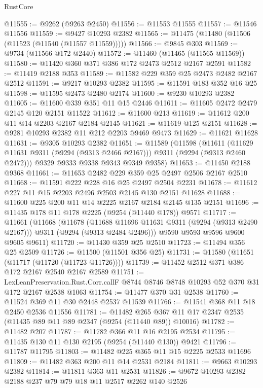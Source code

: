 \begin{lexlean}{RustCore}
\begin{coremodule}
@11555 := @9262 (@9263 @2450)
@11556 := @11553 @11555
@11557 := @11546 @11556
@11559 := @9427 @10293 @2382
@11565 := @11475 (@11480 (@11506 (@11523 (@11540 (@11557 @11559)))))
@11566 := @9845 @303
@11569 := @9734 (@11566 @172 @2440)
@11572 := @11460 (@11465 (@11565 @11569))
@11580 := @11420 @360 @371 @386 @172 @2473 @2512 @2167 @2591
@11582 := @11419 @2188 @353
@11589 := @11582 @229 @359 @25 @2473 @2482 @2167 @2512
@11591 := @9217 @10293 @2382
@11595 := @11591 @183 @352 @16 @25
@11598 := @11595 @2473 @2480 @2174
@11600 := @9230 @10293 @2382
@11605 := @11600 @339 @351 @11 @15 @2446
@11611 := @11605 @2472 @2479 @2145 @120 @2151 @11522
@11612 := @11600 @213
@11619 := @11612 @200 @11 @14 @2203 @2167 @2184 @2145
@11621 := @11619 @125 @2151
@11628 := @9281 @10293 @2382 @11 @212 @2203 @9469 @9473
@11629 := @11621 @11628
@11631 := @9305 @10293 @2382
@11651 := @11589
    (@11598
      (@11611 (@11629 @11631 @9311 (@9294 (@9313 @2466 @2167))) @9311 (@9294 (@9313 @2460 @2472)))
      @9329
      @9333
      @9338
      @9343
      @9349
      @9358)
@11653 := @11450 @2188 @9368
@11661 := @11653 @2482 @229 @359 @25 @2497 @2506 @2167 @2510
@11668 := @11591 @222 @228 @16 @25 @2497 @2504 @2231
@11678 := @11612 @227 @11 @15 @2203 @2496 @2503 @2145 @130 @2151 @11628
@11688 := @11600 @225 @200 @11 @14 @2225 @2167 @2184 @2145 @135 @2151
@11696 := @11435 @178 @11 @178 @2225 (@9254 (@11440 @178)) @9571
@11717 := @11661
    (@11668
      (@11678
        (@11688 @11696 @11631 @9311 (@9294 (@9313 @2490 @2167)))
        @9311
        (@9294 (@9313 @2484 @2496)))
      @9590
      @9593
      @9596
      @9600
      @9605
      @9611)
@11720 := @11430 @359 @25 @2510
@11723 := @11494 @356 @25 @2509
@11726 := @11500 (@11501 @356 @25)
@11731 := @11580 (@11651 (@11717 (@11720 (@11723 @11726))))
@11739 := @11452 @2512 @371 @386 @172 @2167 @2540 @2167 @2589
@11751 := LexLeanPreservation.Rust.Corr.callF
    @8744
    @8746
    @8748
    @10293
    @52
    @370
    @31
    @172
    @2167
    @2538
    @1063
@11754 := @11477 @370 @31 @2538
@11760 := @11524 @369 @11 @30 @2448 @2537 @11539
@11766 := @11541 @368 @11 @18 @2450 @2536 @11556
@11781 := @11482
    @265
    @367
    @11
    @17
    @2347
    @2535
    (@11435 @89 @11 @89 @2347 (@9254 (@11440 @89)) @10016)
@11782 := @11482 @207
@11787 := @11782 @366 @11 @16 @2195 @2534
@11795 := @11435 @130 @11 @130 @2195 (@9254 (@11440 @130)) @9421
@11796 := @11787 @11795
@11803 := @11482 @225 @365 @11 @15 @2225 @2533 @11696
@11809 := @11482 @363 @200 @11 @14 @2531 @2184
@11811 := @9663 @10293 @2382
@11814 := @11811 @363 @11 @2531
@11826 := @9672 @10293 @2382 @2188 @237 @79 @79 @18 @11 @2517 @2262 @140 @2526

\end{coremodule}
\end{lexlean}
